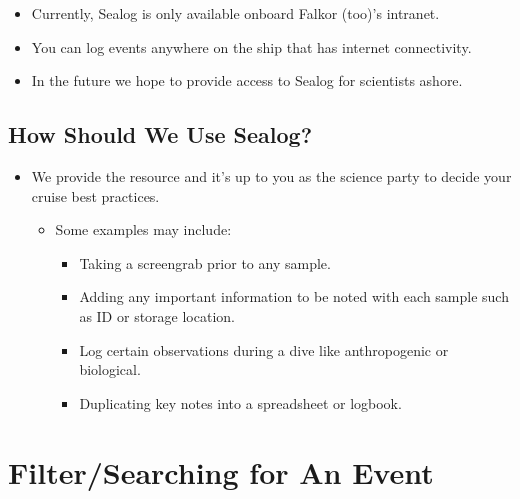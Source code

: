 \documentclass[
  letterpaper,
  DIV=11,
  numbers=noendperiod]{scrreprt}
\providecommand{\tightlist}{%
  \setlength{\itemsep}{0pt}\setlength{\parskip}{0pt}}\usepackage{longtable,booktabs,array}
\begin{document}
\begin{itemize}
\tightlist
\item
  Currently, Sealog is only available onboard Falkor (too)'s intranet.
\item
  You can log events anywhere on the ship that has internet
  connectivity.
\item
  In the future we hope to provide access to Sealog for scientists
  ashore.
\end{itemize}

\hypertarget{how-should-we-use-sealog}{%
\subsection{How Should We Use Sealog?}\label{how-should-we-use-sealog}}

\begin{itemize}
\tightlist
\item
  We provide the resource and it's up to you as the science party to
  decide your cruise best practices.

  \begin{itemize}
  \tightlist
  \item
    Some examples may include:

    \begin{itemize}
    \tightlist
    \item
      Taking a screengrab prior to any sample.
    \item
      Adding any important information to be noted with each sample such
      as ID or storage location.
    \item
      Log certain observations during a dive like anthropogenic or
      biological.
    \item
      Duplicating key notes into a spreadsheet or logbook.
    \end{itemize}
  \end{itemize}
\end{itemize}

\hypertarget{filtersearching-for-an-event}{%
\section{Filter/Searching for An
Event}\label{filtersearching-for-an-event}}
\end{document}
